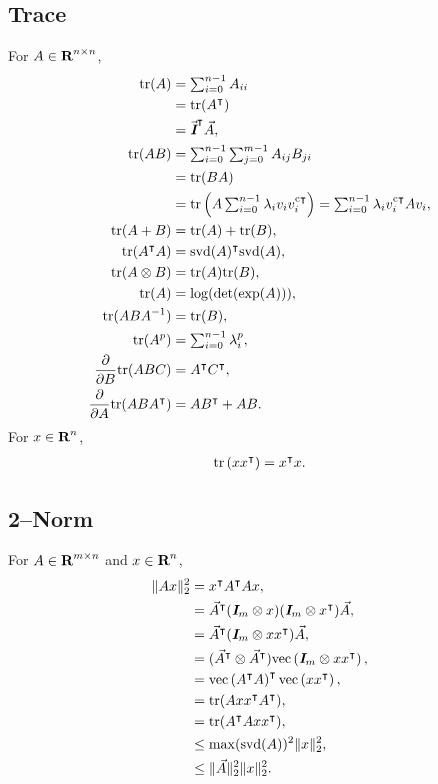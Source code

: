 \documentclass{article}
\begin{document}
\subsection{Trace}
    For $A\in\textbf{R}^{n\times n}$,
    \begin{align*}
        \text{tr}(A)&=\textstyle\sum_{i=0}^{n-1} A_{ii}\\
        &=\text{tr}(A^\intercal)\\
        &=\vec{\emph{\textbf{I}}}^\intercal\vec{A},\\
        \text{tr}(AB)&=\textstyle\sum_{i=0}^{n-1}\sum_{j=0}^{m-1}A_{ij}B_{ji}\\
        &=\text{tr}(BA)\\
        &=\text{tr}\left(A\textstyle
        \sum_{i=0}^{n-1}\lambda_i v_iv_i^{\text{c}\intercal}\right)=\textstyle\sum_{i=0}^{n-1}\lambda_i v_i^{\text{c}\intercal} A v_i,\\
        \text{tr}(A+B)&=\text{tr}(A)+\text{tr}(B),\\
        \text{tr}(A^\intercal A)&=\text{svd}(A)^\intercal \text{svd}(A),\\
        \text{tr}(A\otimes B)&=\text{tr}(A)\text{tr}(B),\\
        \text{tr}(A)&=\log(\det(\exp(A))),\\
        \text{tr}(ABA^{-1})&=\text{tr}(B),\\
        \text{tr}(A^p)&=\textstyle\sum_{i=0}^{n-1}\lambda_i^p,\\
        \frac{\partial }{\partial B}\text{tr}(ABC)&=A^\intercal C^\intercal,\\
        \frac{\partial }{\partial A}\text{tr}(ABA^\intercal)&=AB^\intercal+AB.
    \end{align*}
    For $x\in\textbf{R}^n$,
    \begin{align*}
        \text{tr}\left(xx^\intercal\right)=x^\intercal x.
    \end{align*}
\subsection{2--Norm}
    For $A\in\textbf{R}^{m\times n}$ and $x\in\textbf{R}^{n}$,
    \begin{align*}
        \|Ax\|_2^2&=x^\intercal A^\intercal A x,\\
        &=\vec{A}^\intercal (\emph{\textbf{I}}_m\otimes x)(\emph{\textbf{I}}_m\otimes x^\intercal) \vec{A},\\
        &=\vec{A}^\intercal(\emph{\textbf{I}}_m\otimes xx^\intercal)\vec{A},\\
        &=(\vec{A}^\intercal\otimes\vec{A}^\intercal)\mathrm{vec}\left(\emph{\textbf{I}}_m\otimes xx^\intercal\right),\\
        &=\mathrm{vec}\left(A^\intercal A\right)^\intercal\mathrm{vec}\left(xx^\intercal\right),\\
        &=\text{tr}(Axx^\intercal A^\intercal),\\
        &=\text{tr}(A^\intercal A x x^\intercal),\\
        &\leq\max(\text{svd}(A))^2\|x\|_2^2,\\
        &\leq\|\vec{A}\|_2^2\|x\|_2^2.
    \end{align*}
\end{document}
